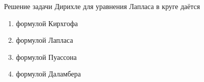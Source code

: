 Решение задачи Дирихле для уравнения Лапласа в круге даётся

\begin{enumerate}[label=\arabic*)]
    \item формулой Кирхгофа
    \item формулой Лапласа
    \item формулой Пуассона
    \item формулой Даламбера
\end{enumerate}

